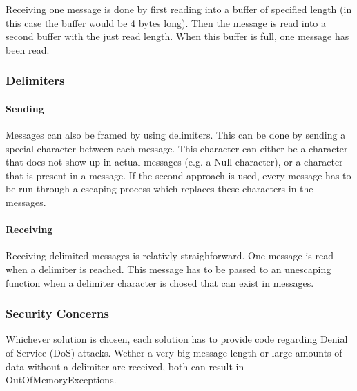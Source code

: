Receiving one message is done by first reading into a buffer of specified length (in this case the buffer would be 4 bytes long). Then the message is read into a second buffer with the just read length. When this buffer is full, one message has been read.

\subsubsection{Delimiters}

\paragraph{Sending}

Messages can also be framed by using delimiters. This can be done by sending a special character between each message. This character can either be a character that does not show up in actual messages (e.g. a Null character), or a character that is present in a message. If the second approach is used, every message has to be run through a escaping process which replaces these characters in the messages.

\paragraph{Receiving}

Receiving delimited messages is relativly straighforward. One message is read when a delimiter is reached. This message has to be passed to an unescaping function when a delimiter character is chosed that can exist in messages.

\subsubsection{Security Concerns}

Whichever solution is chosen, each solution has to provide code regarding Denial of Service (DoS) attacks. Wether a very big message length or large amounts of data without a delimiter are received, both can result in OutOfMemoryExceptions.

